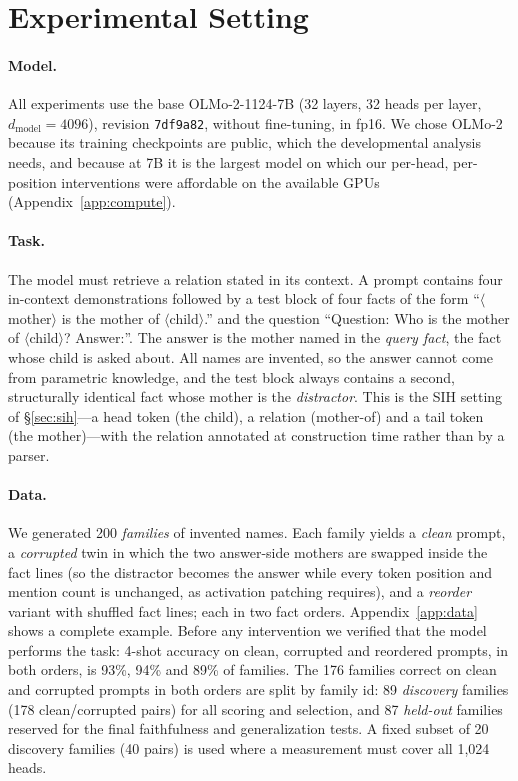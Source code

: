 \section{Experimental Setting}
\label{sec:setting}

\paragraph{Model.}
All experiments use the base OLMo-2-1124-7B \citep{olmo2024olmo2} (32 layers, 32
heads per layer, $d_{\text{model}}{=}4096$), revision
\texttt{7df9a82}, without fine-tuning, in fp16. We chose OLMo-2 because its training
checkpoints are public, which the developmental analysis needs, and because at 7B it
is the largest model on which our per-head, per-position interventions were
affordable on the available GPUs (Appendix~\ref{app:compute}).

\paragraph{Task.}
The model must retrieve a relation stated in its context. A prompt contains four
in-context demonstrations followed by a test block of four facts of the form
``$\langle$mother$\rangle$ is the mother of $\langle$child$\rangle$.'' and the
question ``Question: Who is the mother of $\langle$child$\rangle$? Answer:''. The
answer is the mother named in the \emph{query fact}, the fact whose child is asked
about. All names are invented, so the answer cannot come from parametric knowledge,
and the test block always contains a second, structurally identical fact whose mother
is the \emph{distractor}. This is the SIH setting of \S\ref{sec:sih}---a head token
(the child), a relation (mother-of) and a tail token (the mother)---with the relation
annotated at construction time rather than by a parser.

\paragraph{Data.}
We generated 200 \emph{families} of invented names. Each family yields a
\emph{clean} prompt, a \emph{corrupted} twin in which the two answer-side mothers are
swapped inside the fact lines (so the distractor becomes the answer while every token
position and mention count is unchanged, as activation patching requires), and a
\emph{reorder} variant with shuffled fact lines; each in two fact orders.
Appendix~\ref{app:data} shows a complete example. Before any intervention we
verified that the model performs the task: 4-shot accuracy on clean, corrupted and
reordered prompts, in both orders, is 93\%, 94\% and 89\% of families. The 176
families correct on clean and corrupted prompts in both orders are split by family
id: 89 \emph{discovery} families (178 clean/corrupted pairs) for all scoring and
selection, and 87 \emph{held-out} families reserved for the final faithfulness and
generalization tests. A fixed subset of 20 discovery families (40 pairs) is used
where a measurement must cover all 1,024 heads.

